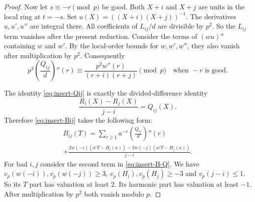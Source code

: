 \begin{proof}
Now let $s\equiv-r\pmod p$ be good.  Both $X+i$ and $X+j$ are units in the
local ring at $t=-s$.  Set
$u(X)=((X+i)(X+j))^{-1}$.  The derivatives $u,u',u''$ are integral there.
All coefficients of $L_{ij}/d$ are divisible by $p^2$.  So the $L_{ij}$ term
vanishes after the present reduction.  Consider the terms of $(wu)''$
containing $w$ and $w'$.  By the local-order bounds for $w,w',w''$, they also
vanish after multiplication by $p^2$.  Consequently
\begin{equation}
 p^2\left(\frac{Q_{ij}}d\right)''(r)
 \equiv\frac{p^2w''(r)}{(r+i)(r+j)}\pmod p
 \quad\text{when }-r\text{ is good}.                         
 \label{eq:insert-Q-good-residue}
\end{equation}

The identity \eqref{eq:insert-Qij} is exactly the divided-difference identity
\[
 \frac{R_i(X)-R_j(X)}{j-i}=Q_{ij}(X).
\]
Therefore \eqref{eq:insert-Bij} takes the following form:
\begin{multline}
 B_{ij}(T)=\sum_{r\geq1}a^{-r}\left(\frac{Q_{ij}}d\right)''(r)\\
 +\frac{2w(-i)(a^iT-H_i(a))-2w(-j)(a^jT-H_j(a))}{j-i}.
 \label{eq:insert-B-Q}
\end{multline}
For bad $i,j$ consider the second term in \eqref{eq:insert-B-Q}.  We have
$v_p(w(-i)),v_p(w(-j))\geq3$, $v_p(H_i),v_p(H_j)\geq-3$ and
$v_p(j-i)\leq1$.  So its $T$ part has valuation at least $2$.  Its
harmonic part has valuation at least $-1$.  After multiplication by $p^2$
both vanish modulo $p$.


\end{proof}
